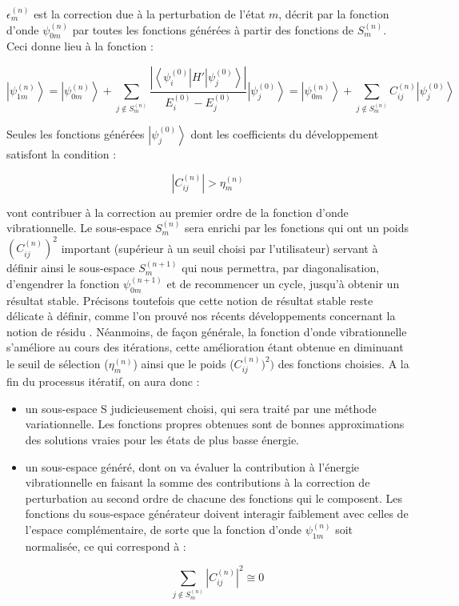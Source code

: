 \documentclass[12pt,a4paper]{book}
\begin{document}
$\epsilon^{(n)}_{m}$ est la correction due à la perturbation de l'état $m$, décrit par la fonction d'onde $\psi^{(n)}_{0m}$ par toutes les fonctions générées à partir des fonctions de $S^{(n)}_{m}$.
Ceci donne lieu à la fonction :


\begin{equation}
\left| \psi^{(n)}_{1m} \right\rangle  =  \left| \psi^{(n)}_{0m} \right\rangle + \sum_{j \notin  S^{(n)}_{m}}  \frac{| \left\langle \psi^{(0)}_{i} \right| H' \left| \psi^{(0)}_{j} \right\rangle |} {E^{(0)}_{i} - E^{(0)}_{j}}  \left| \psi^{(0)}_{j} \right\rangle = \left| \psi^{(n)}_{0m} \right\rangle  + \sum_{j \notin  S^{(n)}_{m}} C_{ij}^{(n)} \left| \psi^{(0)}_{j} \right\rangle
\end{equation}

Seules les fonctions générées $\left \vert \psi^{(0)}_{j} \right \rangle$ dont les coefficients du développement satisfont la condition :


\begin{equation}
\left| C_{ij}^{(n)} \right| > \eta^{(n)}_{m}
\end{equation}

vont contribuer à la correction au premier ordre de la fonction d'onde vibrationnelle. Le sous-espace $S^{(n)}_{m}$ sera enrichi par les fonctions qui ont un poids $(C_{ij}^{(n)})^2$ important (supérieur à un seuil choisi par l'utilisateur) servant à définir ainsi le sous-espace $S^{(n+1)}_{m}$ qui nous permettra, par diagonalisation, d'engendrer la fonction $\psi^{(n+1)}_{0m}$ et de recommencer un cycle, jusqu'à obtenir un résultat stable. Précisons toutefois que cette notion de \og résultat stable \fg{} reste délicate à définir, comme l'on prouvé nos récents développements concernant la notion de résidu \cite{garnier2016adaptive}. Néanmoins, de façon générale, la fonction d'onde vibrationnelle s'améliore au cours des itérations, cette amélioration étant obtenue en diminuant le seuil de sélection ($\eta^{(n)}_{m}$) ainsi que le poids ($C_{ij}^{(n)})^2)$ des fonctions choisies. A la fin du processus itératif, on aura donc :
\begin{itemize}
\item un sous-espace S judicieusement choisi, qui sera traité par une méthode variationnelle. Les fonctions propres obtenues sont de bonnes approximations des solutions vraies pour les états de plus basse énergie.
\item un sous-espace généré, dont on va évaluer la contribution à l'énergie vibrationnelle en faisant la somme des contributions à la correction de perturbation au second ordre de chacune des fonctions qui le composent. Les fonctions du sous-espace générateur doivent interagir faiblement avec celles de l'espace complémentaire, de sorte que la fonction d'onde $\psi^{(n)}_{1m}$ soit normalisée, ce qui correspond à :

\begin{equation}
\sum_{j \notin  S^{(n)}_{m}}  \left| C_{ij}^{(n)} \right|^2  \cong 0
\end{equation}
\end{itemize}


\renewcommand{\bibname}{Références bibliographiques}


\end{document}
